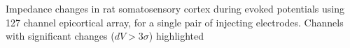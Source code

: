 \label{EPDZ} Impedance changes in rat somatosensory cortex during evoked potentials using 127 channel epicortical array, for a single pair of injecting electrodes.  Channels with significant changes ($dV > 3\sigma$) highlighted